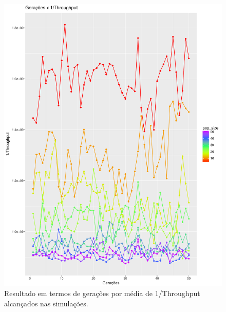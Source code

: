 \documentclass[conference]{IEEEtran}
\begin{document}
\begin{figure}[h]
  \centering
  \includegraphics[scale=0.30]{figures/GeracoesXThroughput.pdf}
  \caption{Resultado em termos de gerações por média de 1/Throughput alcançados nas simulações.}
  \label{fig:result-throughput}
\end{figure}
\end{document}
